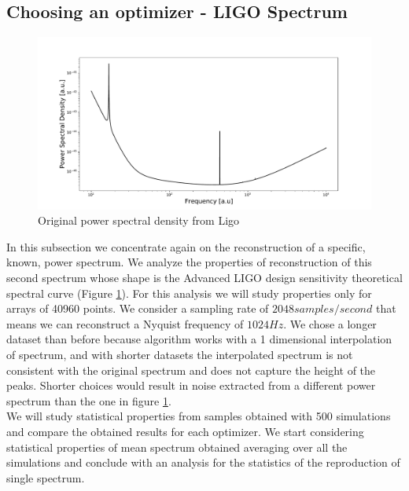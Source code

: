 \documentclass[twocolumn,showpacs,preprintnumbers,nofootinbib,prd,
superscriptaddress,10pt]{revtex4-1}
\begin{document}
\subsection{Choosing an optimizer - LIGO Spectrum} \label{sec:LIGO_validation}
\begin{figure}
    \centering
    \includegraphics[width = \linewidth]{Images/LIGOsimulate/LigoPSDoriginal.pdf}
    \caption{Original power spectral density from Ligo}
    \label{fig:LigoPSDOriginal}
\end{figure}
In this subsection we concentrate again on the reconstruction of a specific, known, power spectrum.
We analyze the properties of reconstruction of this second spectrum whose shape is the Advanced LIGO design sensitivity theoretical spectral curve (Figure \ref{fig:LigoPSDOriginal}). 
For this analysis we will study properties only for arrays of 40960 points. We consider a sampling rate of $2048 samples / second$ that means we can reconstruct a Nyquist frequency of $1024 Hz$. We chose a longer dataset than before because algorithm works with a 1 dimensional interpolation of spectrum, and with shorter datasets the interpolated spectrum is not consistent with the original spectrum and does not capture the height of the peaks. Shorter choices would result in noise extracted from a different power spectrum than the one in figure \ref{fig:LigoPSDOriginal}. \\ 
We will study statistical properties from samples obtained with 500 simulations and compare the obtained results for each optimizer. 
We start considering statistical properties of mean spectrum obtained averaging over all the simulations and conclude with an analysis for the statistics of the reproduction of single spectrum. 
\end{document}
